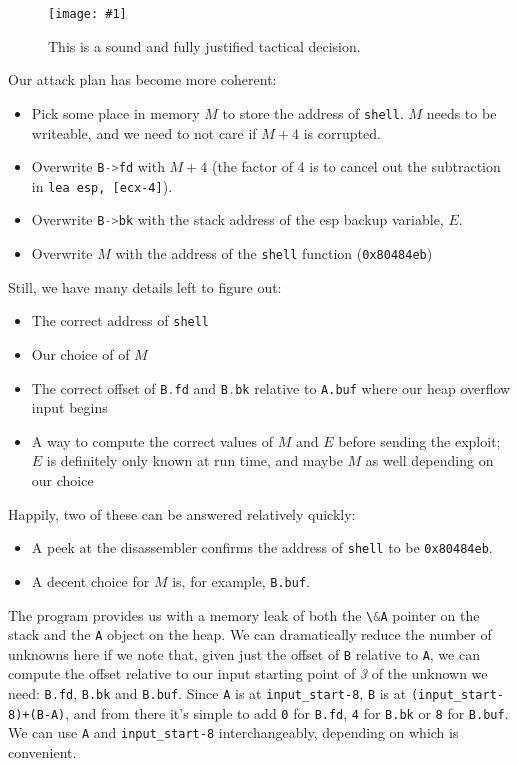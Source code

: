 \documentclass{article}
\newcommand{\displayimagecaphere}[2] {
    \begin{figure}[H]
    \centering
    \texttt{[image: \#1]} 
    \caption{#2}
\end{figure}
}
\newcommand{\xcode}[2]{\colorbox{ubuntuback}{\lstinline[language=#1]|#2|}}
\newcommand{\asm}[1]{\xcode{{[x86masm]assembler}}{#1}}
\newcommand{\code}[1]{\colorbox{ubuntuback}{\texttt{#1}}}
\begin{document}
\displayimagecaphere{../18_unlink/dog_chemistry_set.jpg}{This is a sound and fully justified tactical decision.}

Our attack plan has become more coherent:

\begin{itemize}
            \item Pick some place in memory $M$ to store the address of \code{shell}. $M$ needs to be writeable, and we need to not care if $M+4$ is corrupted.
            \item Overwrite \xcode{C}{B->fd} with $M+4$ (the factor of 4 is to cancel out the subtraction in \asm{lea esp, [ecx-4]}).
            \item Overwrite \xcode{C}{B->bk} with the stack address of the esp backup variable, $E$.
            \item Overwrite $M$ with the address of the \xcode{C}{shell} function (\code{0x80484eb})
\end{itemize}


Still, we have many details left to figure out:

\begin{itemize}
    \item The correct address of \xcode{C}{shell}
    \item Our choice of of $M$
    \item The correct offset of \xcode{C}{B.fd} and \xcode{C}{B.bk} relative to \code{A.buf} where our heap overflow input begins 
    \item A way to compute the correct values of $M$ and $E$ before sending the exploit; $E$ is definitely only known at run time, and maybe $M$ as well depending on our choice
\end{itemize}

Happily, two of these can be answered relatively quickly:
\begin{itemize}
    \item A peek at the disassembler confirms the address of \xcode{C}{shell} to be \code{0x80484eb}. 
    \item A decent choice for $M$ is, for example, \code{B.buf}. 
\end{itemize}

The program provides us with a memory leak of both the \xcode{C}{\&A} pointer on the stack and the \xcode{C}{A} object on the heap. We can dramatically reduce the number of unknowns here if we note that, given just the offset of \code{B} relative to \code{A}, we can compute the offset relative to our input starting point of \textit{3} of the unknown we need: \code{B.fd}, \code{B.bk} and \code{B.buf}. Since \code{A} is at \code{input\_start-8}, \code{B} is at \code{(input\_start-8)+(B-A)}, and from there it's simple to add \code{0} for \code{B.fd}, \code{4} for \code{B.bk} or \code{8} for \code{B.buf}. We can use \code{A} and \code{input\_start-8} interchangeably, depending on which is convenient.  
\end{document}

